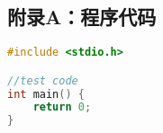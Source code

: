 \documentclass[UTF8,zihao=-4,twoside]{ctexart}
\newcommand{\fancystyle}[3]{
    \pagestyle{fancy}{
        \fancyhf{}
        \fancyhead[CO]{\zihao{5}#1}
        \fancyhead[CE]{\zihao{5}#2}
        \fancyfoot[C]{\zihao{5}#3\thepage}}}
\newcommand{\appendfancystyle}{  %
    \fancystyle{附录}{附录}{}}
\begin{document}
    \begin{appendix}
    \section{附录A：\texorpdfstring{\;}{}程序代码}

        \begin{lstlisting}[language=C,escapeinside=``]
#include <stdio.h>

//test code
int main() {
    return 0;
}

        \end{lstlisting}
    \end{appendix}
\end{document}
